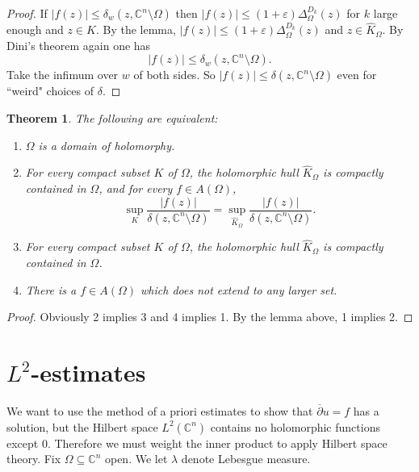\documentclass[12pt]{report}
\newcommand{\CC}{\mathbb{C}}
\newcommand{\dbar}{\overline \partial}
\newtheorem{theorem}{Theorem}[chapter]
\theoremstyle{definition}
\begin{document}
\begin{proof}
    If $|f(z)| \leq \delta_w(z, \CC^n \setminus \Omega)$ then $|f(z)| \leq (1 + \varepsilon) \Delta^{D_k}_\Omega(z)$ for $k$ large enough and $z \in K$. By the lemma, $|f(z)| \leq (1 + \varepsilon)\Delta_\Omega^{D_k}(z)$ and $z \in \hat K_\Omega$. By Dini's theorem again one has
    $$|f(z)| \leq \delta_w(z, \CC^n \setminus \Omega).$$
    Take the infimum over $w$ of both sides. So $|f(z)| \leq \delta(z, \CC^n \setminus \Omega)$ even for ``weird" choices of $\delta$. 
\end{proof}



\begin{theorem}
The following are equivalent:
\begin{enumerate}
    \item $\Omega$ is a domain of holomorphy.
    \item For every compact subset $K$ of $\Omega$, the holomorphic hull $\hat K_\Omega$ is compactly contained in $\Omega$, and for every $f \in A(\Omega)$,
    $$\sup_K \frac{|f(z)|}{\delta(z, \CC^n \setminus \Omega)} = \sup_{\hat K_\Omega} \frac{|f(z)|}{\delta(z, \CC^n \setminus \Omega)}.$$
    \item For every compact subset $K$ of $\Omega$, the holomorphic hull $\hat K_\Omega$ is compactly contained in $\Omega$.
    \item There is a $f \in A(\Omega)$ which does not extend to any larger set.
\end{enumerate}
\end{theorem}
\begin{proof}
    Obviously 2 implies 3 and 4 implies 1. By the lemma above, 1 implies 2.
\end{proof}




\section{$L^2$-estimates}
We want to use the method of a priori estimates to show that $\dbar u = f$ has a solution, but the Hilbert space $L^2(\CC^n)$ contains no holomorphic functions except $0$. Therefore we must weight the inner product to apply Hilbert space theory. Fix $\Omega \subseteq \CC^n$ open. We let $\lambda$ denote Lebesgue measure.
\end{document}

